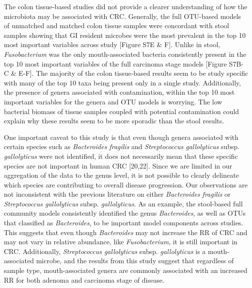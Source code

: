 \documentclass[12pt,]{article}
\begin{document}
The colon tissue-based studies did not provide a clearer understanding
of how the microbiota may be associated with CRC. Generally, the full
OTU-based models of unmatched and matched colon tissue samples were
concordant with stool samples showing that GI resident microbes were the
most prevalent in the top 10 most important variables across study
{[}Figure S7E \& F{]}. Unlike in stool, \emph{Fusobacterium} was the
only mouth-associated bacteria consistently present in the top 10 most
important variables of the full carcinoma stage models {[}Figure S7B-C
\& E-F{]}. The majority of the colon tissue-based results seem to be
study specific with many of the top 10 taxa being present only in a
single study. Additionally, the presence of genera associated with
contamination, within the top 10 most important variables for the genera
and OTU models is worrying. The low bacterial biomass of tissue samples
coupled with potential contamination could explain why these results
seem to be more sporadic than the stool results.

One important caveat to this study is that even though genera associated
with certain species such as \emph{Bacteroides fragilis} and
\emph{Streptococcus gallolyticus} subsp. \emph{gallolyticus} were not
identified, it does not necessarily mean that these specific species are
not important in human CRC {[}20,22{]}. Since we are limited in our
aggregation of the data to the genus level, it is not possible to
clearly delineate which species are contributing to overall disease
progression. Our observations are not inconsistent with the previous
literature on either \emph{Bacteroides fragilis} or \emph{Streptococcus
gallolyticus} subsp. \emph{gallolyticus}. As an example, the stool-based
full community models consistently identified the genus
\emph{Bacteroides}, as well as OTUs that classified as
\emph{Bacteroides}, to be important model components across studies.
This suggests that even though \emph{Bacteroides} may not increase the
RR of CRC and may not vary in relative abundance, like
\emph{Fusobacterium}, it is still important in CRC. Additionally,
\emph{Streptococcus gallolyticus} subsp. \emph{gallolyticus} is a
mouth-associated microbe, and the results from this study suggest that
regardless of sample type, mouth-associated genera are commonly
associated with an increased RR for both adenoma and carcinoma stage of
disease.
\end{document}
